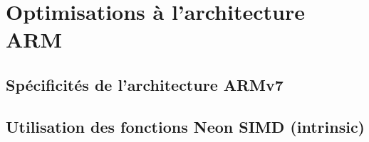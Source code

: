 \documentclass{article}
\begin{document}
    \newpage
    \section{Optimisations à l'architecture ARM}
    \subsection{Spécificités de l'architecture ARMv7}
    \paragraph{}

    \subsection{Utilisation des fonctions Neon SIMD (intrinsic)}

\end{document}
